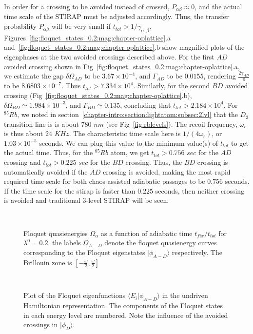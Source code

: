 In order for a crossing to be avoided instead of crossed, $P_{\alpha\beta}\approx 0$, and the actual time scale of the STIRAP must be adjusted accordingly. Thus, the transfer probability $P_{\alpha \beta}$ will be very small if $t_{tot}>1/{\gamma}_{\alpha,\beta}$. 
Figures~\ref{fig:floquet_states_0.2:mag:chapter-oplattice}.a and~\ref{fig:floquet_states_0.2:mag:chapter-oplattice}.b show magnified plots of the eigenphases at the two avoided crossings described above. For the first $AD$ avoided crossing shown in Fig~\ref{fig:floquet_states_0.2:mag:chapter-oplattice}.a, we estimate the gap $\delta \Omega_{AD}$ to be $3.67 \times 10^{-4}$, and $\Gamma_{AD}$ to be $0.0155$, rendering $\frac{2\gamma_{AD}}{\pi}$ to be $8.6803 \times 10^{-7}$. Thus $t_{tot}>7.334 \times 10^{4}$. Similarly, for the second $BD$ avoided crossing (Fig~\ref{fig:floquet_states_0.2:mag:chapter-oplattice}.b), $\delta \Omega_{BD}\simeq 1.984 \times 10^{-3}$, and  $\Gamma_{BD}\simeq 0.135$, concluding that $t_{tot}>2.184 \times 10^4$. For $^{85}Rb$, we noted in section~\ref{chapter-intro:section:lightatom:subsec:2lvl} that the $D_2$ transition line is is about $780$ $nm$ (see Fig~\ref{fig:rblevels}). The recoil frequency, $ \omega_r$ is thus about $24$ $KHz$. The characteristic time scale here is $1/(4\omega_r)$, or $1.03 \times 10^{-5}$ seconds. We can plug this value to the minimum value(s) of $t_{tot}$ to get the actual time. Thus, for the $^{85}Rb$ atom, we get $t_{tot}>0.756$ $sec$ for the $AD$ crossing and $t_{tot}>0.225$ $sec$ for the $BD$ crossing. Thus, the $BD$ crossing is automatically avoided if the $AD$ crossing is avoided, making the most rapid required time scale for both chaos assisted adiabatic passages to be $0.756$ seconds. If the time scale for the stirap is faster than $0.225$ seconds, then neither crossing is avoided and traditional 3-level STIRAP will be seen.
\begin{figure} 
\vspace*{-0.1in}
\ 
\caption{Floquet quasienergies $\Omega_{\alpha}$ as a function of adiabatic time $t_{fix}/t_{tot}$ for $\lambda^0=0.2$. the labels $\Omega_{A-D}$ denote the floquet quasienergy curves corresponding to the Floquet eigenstates $|\phi_{A-D}\rangle$ respectively. The Brillouin zone is $\left[-\frac{\omega}{2}, \frac{\omega}{2}\right]$}
\label{fig:floquet_quasi_0.2:chapter-oplattice}
\end{figure}
\begin{figure} 
\ 
\caption{Plot of the Floquet eigenfunctions $\langle E_i|\phi_{A-D}\rangle$ in the undriven Hamiltonian representation. The components of the Floquet states in each energy level are numbered. Note the influence of the avoided crossings in $|\phi_D\rangle$.}
\label{fig:floquet_states_0.2:chapter-oplattice}
\end{figure}
